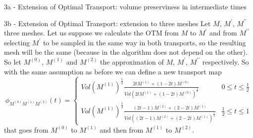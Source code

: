 \documentclass[b0paper,portrait]{baposter}
\begin{document}
\begin{poster}
\begin{posterbox}[name=otm2,below=otm,span=6,column=0]{3a
    - Extension of Optimal Transport: volume preserviness in intermediate times }
\end{posterbox}
\begin{posterbox}[name=otm3,below=otm2,span=6,column=0]{3b
    - Extension of Optimal Transport: extension to three meshes }
Let $M$, $M^{\prime}$, $M^{\prime\prime}$ three meshes. Let us suppose we calculate the OTM from $M$ to $M^{\prime}$ and from $M^{\prime\prime}$ selecting  $M^{\prime}$ to be sampled in the same way in both transports, so the resulting mesh will be the same (because in the algorithm does not depend on the other). So let $M^{(0)}$, $M^{(1)}$ and $M^{(2)}$ the approximation of $M$, $M^{\prime}$, $M^{\prime\prime}$ respectively. 
So with the same assumption as before we can define a new transport map $$\phi_{M^{(0)}M^{(1)}M^{(2)}}(t)=\begin{cases}
Vol(M^{(1)})^{\frac{1}{3}}\frac{2tM^{(1)}+(1-2t)M^{(0)}}{Vol(2tM^{(1)}+(1-2t)M^{(0)})^{\frac{1}{3}}} & 0 \le t \le \frac{1}{2} \\
Vol(M^{(1)})^{\frac{1}{3}}\frac{(2t-1)M^{(2)}+(2-2t)M^{(1)}}{Vol((2t-1)M^{(2)}+(2-2t)M^{(1)})^{\frac{1}{3}}} & \frac{1}{2} \le t \le 1
\end{cases}$$
that goes from $M^{(0)}$ to $M^{(1)}$ and then from $M^{(1)}$ to $M^{(2)}$.  
\end{posterbox}


\end{poster}
\end{document}
